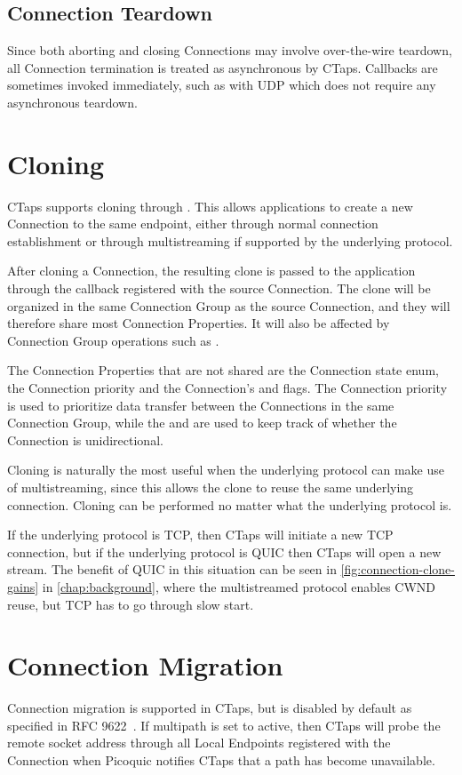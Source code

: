 \subsection{Connection Teardown}
Since both aborting and closing Connections may involve over-the-wire teardown,
all Connection termination is treated as asynchronous by CTaps.
Callbacks are sometimes invoked immediately, such as with UDP which does not
require any asynchronous teardown.

\section{Cloning}
CTaps supports cloning through .
This allows applications to create a new Connection to the same
endpoint, either through normal connection establishment or through
multistreaming if supported by the underlying protocol.

After cloning a Connection, the resulting clone is passed to the application
through the  callback registered with the source Connection.
The clone will be organized in the same Connection Group as the source Connection,
and they will therefore share most Connection Properties. It will also be
affected by Connection Group operations such as . 

The Connection Properties that are not shared are the Connection state enum, the Connection
priority and the Connection's  and  flags.
The Connection priority is used to prioritize data transfer between the Connections
in the same Connection Group, while the  and 
are used to keep track of whether the Connection is unidirectional.

Cloning is naturally the most useful when the underlying protocol can make
use of multistreaming, since this allows the clone to reuse the same underlying connection.
Cloning can be performed no matter what the underlying protocol is.

If the underlying protocol is TCP, then CTaps will initiate a new TCP connection, but
if the underlying protocol is QUIC then CTaps will open a new
stream. The benefit of QUIC in this
situation can be seen in \cref{fig:connection-clone-gains} in \cref{chap:background},
where the multistreamed protocol enables CWND reuse, but TCP has to go through
slow start.

\section{Connection Migration} \label{sec:connection-migration-impl}
Connection migration is supported in CTaps,
but is disabled by default as
specified in RFC 9622~\cite[sec. 6.2.14]{rfc9622}.
If multipath is set to active, then CTaps will probe the remote socket address through all
Local Endpoints registered with the Connection
when Picoquic notifies CTaps that a path has become unavailable.

